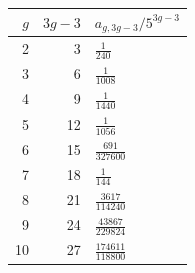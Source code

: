 \begingroup\renewcommand{\arraystretch}{1.35}
\begin{tabular}{rrl}
\toprule $g$ & $3g-3$ & $a_{g,3g-3}/5^{3g-3}$ \\
\midrule
2 & 3 & $\frac{1}{240}$ \\
3 & 6 & $\frac{1}{1008}$ \\
4 & 9 & $\frac{1}{1440}$ \\
5 & 12 & $\frac{1}{1056}$ \\
6 & 15 & $\frac{691}{327600}$ \\
7 & 18 & $\frac{1}{144}$ \\
8 & 21 & $\frac{3617}{114240}$ \\
9 & 24 & $\frac{43867}{229824}$ \\
10 & 27 & $\frac{174611}{118800}$ \\
\bottomrule
\end{tabular}
\endgroup
